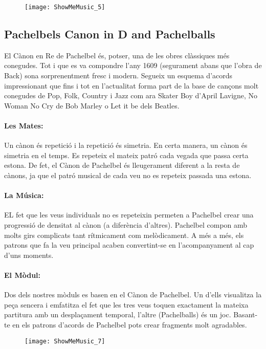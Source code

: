 \begin{figure}[h]
\centering
\texttt{[image: ShowMeMusic\_5]}
\end{figure}


\subsection{Pachelbels Canon in D and Pachelballs}
El Cànon en Re de Pachelbel és, potser, una de les obres clàssiques més conegudes. Tot i que es va compondre l'any 1609 (segurament abans que l'obra de Back) sona sorprenentment fresc i modern. Segueix un esquema d'acords impressionant que fins i tot en l'actualitat forma part de la base de cançons molt conegudes de Pop, Folk, Country i Jazz com ara Skater Boy d'April Lavigne, No Woman No Cry de Bob Marley o Let it be dels Beatles.

\paragraph{Les Mates:} Un cànon és repetició i la repetició és simetria. En certa manera, un cànon és simetria en el temps. Es repeteix el mateix patró cada vegada que passa certa estona. De fet, el Cànon de Pachelbel és lleugerament diferent a la resta de cànons, ja que el patró musical de cada veu no es repeteix passada una estona.

\paragraph{La Música:} EL fet que les veus individuals no es repeteixin permeten a Pachelbel crear una progressió de densitat al cànon (a diferència d'altres). Pachelbel compon amb molts girs complicats tant rítmicament com melòdicament. A més a més, els patrons que fa la veu principal acaben convertint-se en l'acompanyament al cap d'uns moments.

\paragraph{El  Mòdul:} Dos dels nostres mòduls es basen en el Cànon de Pachelbel. Un d'ells visualitza la peça sencera i emfatitza el fet que les tres veus toquen exactament la mateixa partitura amb un desplaçament temporal, l'altre (Pachelballs) és un joc. Basant-te en els patrons d'acords de Pachelbel pots crear fragments molt agradables.

\begin{figure}[t]
\centering
\texttt{[image: ShowMeMusic\_7]}
\end{figure}


